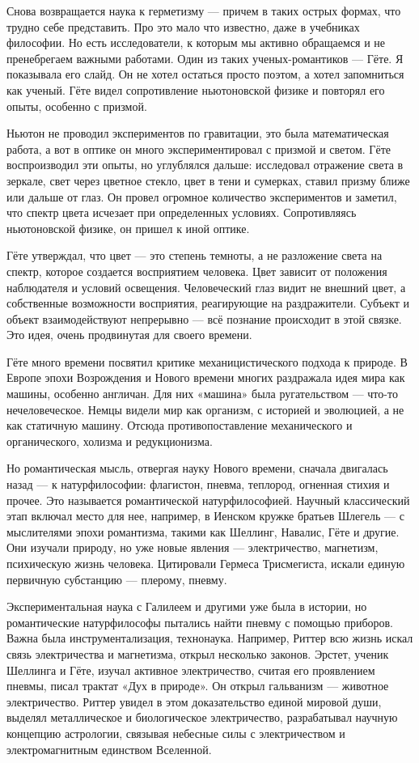 Снова возвращается наука к герметизму --- причем в таких острых формах, что трудно себе представить. Про это мало что известно, даже в учебниках философии. Но есть исследователи, к которым мы активно обращаемся и не пренебрегаем важными работами. Один из таких ученых-романтиков --- Гёте. Я показывала его слайд. Он не хотел остаться просто поэтом, а хотел запомниться как ученый. Гёте видел сопротивление ньютоновской физике и повторял его опыты, особенно с призмой.

Ньютон не проводил экспериментов по гравитации, это была математическая работа, а вот в оптике он много экспериментировал с призмой и светом. Гёте воспроизводил эти опыты, но углублялся дальше: исследовал отражение света в зеркале, свет через цветное стекло, цвет в тени и сумерках, ставил призму ближе или дальше от глаз. Он провел огромное количество экспериментов и заметил, что спектр цвета исчезает при определенных условиях. Сопротивляясь ньютоновской физике, он пришел к иной оптике.

Гёте утверждал, что цвет --- это степень темноты, а не разложение света на спектр, которое создается восприятием человека. Цвет зависит от положения наблюдателя и условий освещения. Человеческий глаз видит не внешний цвет, а собственные возможности восприятия, реагирующие на раздражители. Субъект и объект взаимодействуют непрерывно --- всё познание происходит в этой связке. Это идея, очень продвинутая для своего времени.

Гёте много времени посвятил критике механицистического подхода к природе. В Европе эпохи Возрождения и Нового времени многих раздражала идея мира как машины, особенно англичан. Для них «машина» была ругательством --- что-то нечеловеческое. Немцы видели мир как организм, с историей и эволюцией, а не как статичную машину. Отсюда противопоставление механического и органического, холизма и редукционизма.

Но романтическая мысль, отвергая науку Нового времени, сначала двигалась назад --- к натурфилософии: флагистон, пневма, теплород, огненная стихия и прочее. Это называется романтической натурфилософией. Научный классический этап включал место для нее, например, в Иенском кружке братьев Шлегель --- с мыслителями эпохи романтизма, такими как Шеллинг, Навалис, Гёте и другие. Они изучали природу, но уже новые явления --- электричество, магнетизм, психическую жизнь человека. Цитировали Гермеса Трисмегиста, искали единую первичную субстанцию --- плерому, пневму.

Экспериментальная наука с Галилеем и другими уже была в истории, но романтические натурфилософы пытались найти пневму с помощью приборов. Важна была инструментализация, технонаука. Например, Риттер всю жизнь искал связь электричества и магнетизма, открыл несколько законов. Эрстет, ученик Шеллинга и Гёте, изучал активное электричество, считая его проявлением пневмы, писал трактат «Дух в природе». Он открыл гальванизм --- животное электричество. Риттер увидел в этом доказательство единой мировой души, выделял металлическое и биологическое электричество, разрабатывал научную концепцию астрологии, связывая небесные силы с электричеством и электромагнитным единством Вселенной.

